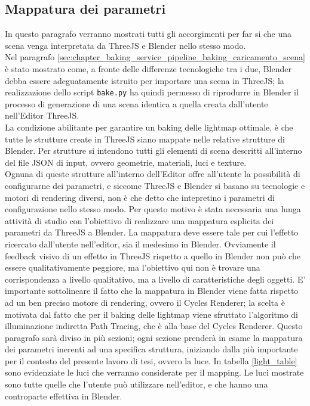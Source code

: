\subsection{Mappatura dei parametri}
\label{sec:chapter_baking_service_pipeline_baking_mapp_parametri}

In questo paragrafo verranno mostrati tutti gli accorgimenti per far si che una scena venga interpretata da ThreeJS e Blender nello stesso modo. 
\\
Nel paragrafo \ref{sec:chapter_baking_service_pipeline_baking_caricamento_scena} è stato mostrato come, a fronte delle differenze tecnologiche tra i due, Blender debba essere adeguatamente istruito per importare una scena in ThreeJS;  la realizzazione dello script \texttt{bake.py} ha quindi permesso di riprodurre in Blender il processo di generazione di una scena identica a quella creata dall’utente nell’Editor ThreeJS. 
\\
La condizione abilitante per garantire un baking delle lightmap ottimale, è che tutte le strutture create in ThreeJS siano mappate nelle relative strutture di Blender. Per strutture si intendono tutti gli elementi di scena descritti all’interno del file JSON di input, ovvero geometrie, materiali, luci e texture.
\\ 
Ognuna di queste strutture all’interno dell’Editor offre all’utente la possibilità di configurarne dei parametri, e siccome ThreeJS e Blender si basano su tecnologie e motori di rendering diversi, non è che detto che intepretino i parametri di configurazione nello stesso modo. Per questo motivo è stata necessaria una lunga attività di studio con l’obiettivo di realizzare una mappatura esplicita dei parametri da ThreeJS a Blender. La mappatura deve essere tale per cui l’effetto ricercato dall’utente nell’editor, sia il medesimo in Blender. Ovviamente il feedback visivo di un effetto in ThreeJS rispetto a quello in Blender non può che essere qualitativamente peggiore, ma l’obiettivo qui non è trovare una corrispondenza a livello qualitativo, ma a livello di caratteristiche degli oggetti. E’ importante sottolineare il fatto che la mappatura in Blender viene fatta rispetto ad un ben preciso motore di rendering, ovvero il Cycles Renderer; la scelta è motivata dal fatto che per il baking delle lightmap viene sfruttato l’algoritmo di illuminazione indiretta Path Tracing, che è alla base del Cycles Renderer. Questo paragrafo sarà diviso in più sezioni; ogni sezione prenderà in esame la mappatura dei parametri inerenti ad una specifica struttura, iniziando dalla più importante per il contesto del presente lavoro di tesi, ovvero la luce. In tabella \ref{light_table} sono evidenziate le luci che verranno considerate per il mapping. Le luci mostrate sono tutte quelle che l’utente può utilizzare nell’editor, e che hanno una controparte effettiva in Blender.
